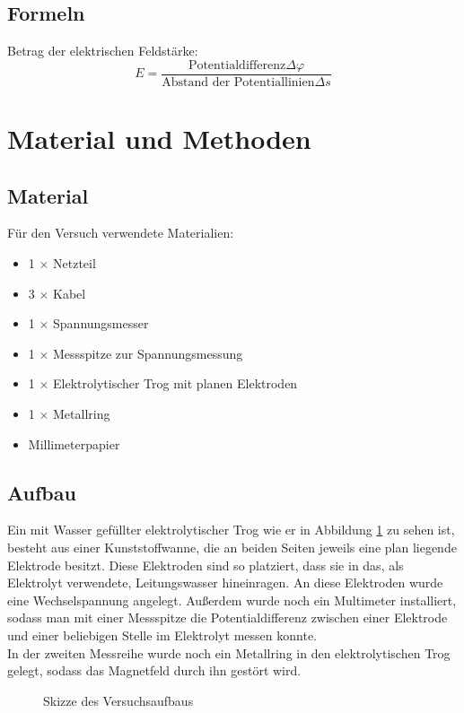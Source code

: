 \documentclass[a4paper,12pt,fleqn,oneside]{article}
\begin{document}
\subsection{Formeln}
	Betrag der elektrischen Feldstärke:\\
	\[E=\frac{\text{Potentialdifferenz}\Delta\varphi}{\text{Abstand der Potentiallinien}\Delta s}\]

\newpage
\section{Material und Methoden}

\subsection{Material}
	Für den Versuch verwendete Materialien:
	\begin{itemize}
		\item 1 $\times$ Netzteil
		\item 3 $\times$ Kabel
		\item 1 $\times$ Spannungsmesser
		\item 1 $\times$ Messspitze zur Spannungsmessung
		\item 1 $\times$ Elektrolytischer Trog mit planen Elektroden
		\item 1 $\times$ Metallring
		\item Millimeterpapier
	\end{itemize}

\subsection{Aufbau}
	Ein mit Wasser gefüllter elektrolytischer Trog wie er in Abbildung \ref{fig:skizze_elektrolytischer_trog} zu sehen ist, besteht aus
	einer Kunststoffwanne, die an beiden Seiten jeweils eine plan liegende Elektrode besitzt. Diese Elektroden sind so platziert, dass
	sie in das, als Elektrolyt verwendete, Leitungswasser hineinragen. An diese  Elektroden wurde eine Wechselspannung angelegt.
	Außerdem wurde noch ein Multimeter installiert, sodass man mit einer Messspitze die Potentialdifferenz zwischen einer Elektrode
	und einer beliebigen Stelle im Elektrolyt messen konnte.\\
	In der zweiten Messreihe wurde noch ein Metallring in den elektrolytischen Trog gelegt, sodass das Magnetfeld durch ihn gestört
	wird.
	

	
	\begin{figure}[H!]
		\centering
		\scalebox{.9}{}
		\caption{Skizze des Versuchsaufbaus}
		\label{fig:skizze_elektrolytischer_trog}
	\end{figure}
\end{document}
